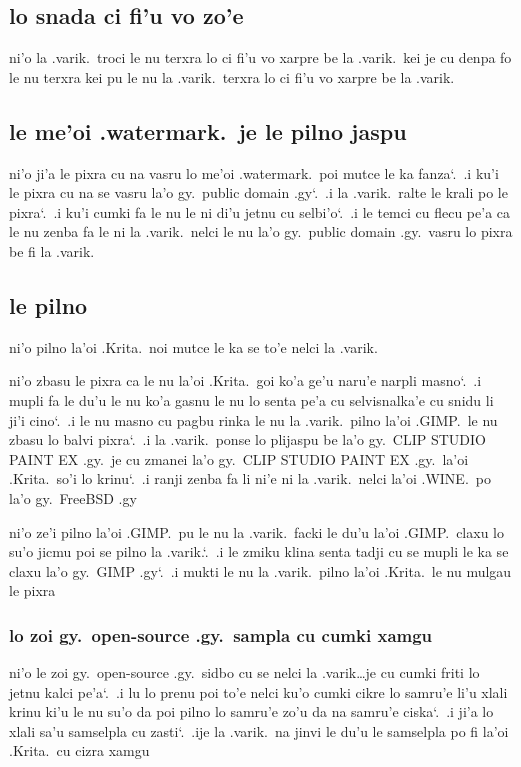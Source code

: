 \documentclass{report}
\newcommand\sds{\spacefactor\sfcode`.\ \space}
\begin{document}
\subsection{lo snada ci fi'u vo zo'e}
ni'o la .varik.\ troci le nu terxra lo ci fi'u vo xarpre be la .varik.\ kei je cu denpa fo le nu terxra kei pu le nu la .varik.\ terxra lo ci fi'u vo xarpre be la .varik.
\subsection{le me'oi .watermark.\ je le pilno jaspu}
ni'o ji'a le pixra cu na vasru lo me'oi .watermark.\ poi mutce le ka fanza\sds  .i ku'i le pixra cu na se vasru la'o gy.\ public domain .gy\sds  .i la .varik.\ ralte le krali po le pixra\sds  .i ku'i cumki fa le nu le ni di'u jetnu cu selbi'o\sds  .i le temci cu flecu pe'a ca le nu zenba fa le ni la .varik.\ nelci le nu la'o gy.\ public domain .gy.\ vasru lo pixra be fi la .varik.

\subsection{le pilno}
ni'o pilno la'oi .Krita.\ noi mutce le ka se to'e nelci la .varik.

ni'o zbasu le pixra ca le nu la'oi .Krita.\ goi ko'a ge'u naru'e narpli masno\sds  .i mupli fa le du'u le nu ko'a gasnu le nu lo senta pe'a cu selvisnalka'e cu snidu li ji'i cino\sds  .i le nu masno cu pagbu rinka le nu la .varik.\ pilno la'oi .GIMP.\ le nu zbasu lo balvi pixra\sds  .i la .varik.\ ponse lo plijaspu be la'o gy.\ CLIP STUDIO PAINT EX .gy.\ je cu zmanei la'o gy.\ CLIP STUDIO PAINT EX .gy.\ la'oi .Krita.\ so'i lo krinu\sds  .i ranji zenba fa li ni'e ni la .varik.\ nelci la'oi .WINE.\ po la'o gy.\ FreeBSD .gy

ni'o ze'i pilno la'oi .GIMP.\ pu le nu la .varik.\ facki le du'u la'oi .GIMP.\ claxu lo su'o jicmu poi se pilno la .varik.\sds  .i le zmiku klina senta tadji cu se mupli le ka se claxu la'o gy.\ GIMP .gy\sds  .i mukti le nu la .varik.\ pilno la'oi .Krita.\ le nu mulgau le pixra

\subsubsection{lo zoi gy.\ open-source .gy.\ sampla cu cumki xamgu}
ni'o le zoi gy.\ open-source .gy.\ sidbo cu se nelci la .varik\ldots je cu cumki friti lo jetnu kalci pe'a\sds  .i lu lo prenu poi to'e nelci ku'o cumki cikre lo samru'e li'u xlali krinu ki'u le nu su'o da poi pilno lo samru'e zo'u da na samru'e ciska\sds  .i ji'a lo xlali sa'u samselpla cu zasti\sds  .ije la .varik.\ na jinvi le du'u le samselpla po fi la'oi .Krita.\ cu cizra xamgu
\end{document}
